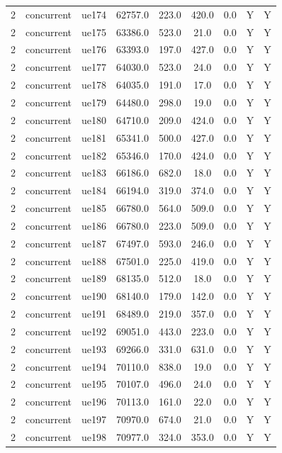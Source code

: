 \begin{table}[ht]
\begin{tabular}{|c|c|c|c|c|c|c|c|c|}
2 & concurrent & ue174 & 62757.0 & 223.0 & 420.0 & 0.0 & Y & Y \\
2 & concurrent & ue175 & 63386.0 & 523.0 & 21.0 & 0.0 & Y & Y \\
2 & concurrent & ue176 & 63393.0 & 197.0 & 427.0 & 0.0 & Y & Y \\
2 & concurrent & ue177 & 64030.0 & 523.0 & 24.0 & 0.0 & Y & Y \\
2 & concurrent & ue178 & 64035.0 & 191.0 & 17.0 & 0.0 & Y & Y \\
2 & concurrent & ue179 & 64480.0 & 298.0 & 19.0 & 0.0 & Y & Y \\
2 & concurrent & ue180 & 64710.0 & 209.0 & 424.0 & 0.0 & Y & Y \\
2 & concurrent & ue181 & 65341.0 & 500.0 & 427.0 & 0.0 & Y & Y \\
2 & concurrent & ue182 & 65346.0 & 170.0 & 424.0 & 0.0 & Y & Y \\
2 & concurrent & ue183 & 66186.0 & 682.0 & 18.0 & 0.0 & Y & Y \\
2 & concurrent & ue184 & 66194.0 & 319.0 & 374.0 & 0.0 & Y & Y \\
2 & concurrent & ue185 & 66780.0 & 564.0 & 509.0 & 0.0 & Y & Y \\
2 & concurrent & ue186 & 66780.0 & 223.0 & 509.0 & 0.0 & Y & Y \\
2 & concurrent & ue187 & 67497.0 & 593.0 & 246.0 & 0.0 & Y & Y \\
2 & concurrent & ue188 & 67501.0 & 225.0 & 419.0 & 0.0 & Y & Y \\
2 & concurrent & ue189 & 68135.0 & 512.0 & 18.0 & 0.0 & Y & Y \\
2 & concurrent & ue190 & 68140.0 & 179.0 & 142.0 & 0.0 & Y & Y \\
2 & concurrent & ue191 & 68489.0 & 219.0 & 357.0 & 0.0 & Y & Y \\
2 & concurrent & ue192 & 69051.0 & 443.0 & 223.0 & 0.0 & Y & Y \\
2 & concurrent & ue193 & 69266.0 & 331.0 & 631.0 & 0.0 & Y & Y \\
2 & concurrent & ue194 & 70110.0 & 838.0 & 19.0 & 0.0 & Y & Y \\
2 & concurrent & ue195 & 70107.0 & 496.0 & 24.0 & 0.0 & Y & Y \\
2 & concurrent & ue196 & 70113.0 & 161.0 & 22.0 & 0.0 & Y & Y \\
2 & concurrent & ue197 & 70970.0 & 674.0 & 21.0 & 0.0 & Y & Y \\
2 & concurrent & ue198 & 70977.0 & 324.0 & 353.0 & 0.0 & Y & Y \\

\end{tabular}
\end{table}
